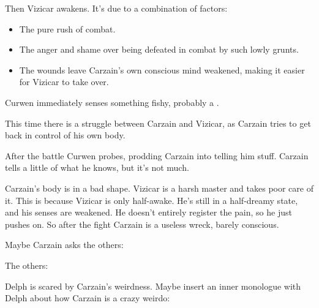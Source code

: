 \begin{garbage}
Then Vizicar awakens. 
It's due to a combination of factors: 

\begin{itemize}
  \item The pure rush of combat. 
  \item The anger and shame over being defeated in combat by such lowly grunts. 
  \item The wounds leave Carzain's own conscious mind weakened, making it easier for Vizicar to take over. 
\end{itemize}




Curwen immediately senses something fishy, probably a \vertexspike{}. 

This time there is a struggle between Carzain and Vizicar, as Carzain tries to get back in control of his own body. 


After the battle Curwen probes, prodding Carzain into telling him stuff. Carzain tells a little of what he knows, but it's not much. 

Carzain's body is in a bad shape. 
Vizicar is a harsh master and takes poor care of it. 
This is because Vizicar is only half-awake. 
He's still in a half-dreamy state, and his senses are weakened. 
He doesn't entirely register the pain, so he just pushes on. 
So after the fight Carzain is a useless wreck, barely conscious. 

Maybe Carzain asks the others:  

The others: 

Delph is scared by Carzain's weirdness. Maybe insert an inner monologue with Delph about how Carzain is a crazy weirdo: 


\end{garbage}
